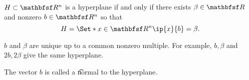
\begin{prop}
  $H \subset \R^n$ is a hyperplane if and only if there exists $\beta \in \R$ and nonzero $b \in \R^n$ so that
  $$
    H = \Set*{x \in \R^n}{\ip{x}{b} = \beta}.
  $$
\end{prop}
\begin{remark}
  $b$ and $\beta$ are unique up to a common nonzero multiple.
  For example, $b, \beta$ and $2b, 2\beta$ give the same hyperplane.
\end{remark}
\begin{remark}
  The vector $b$ is called a \t{normal} to the hyperplane.
\end{remark}
\strats
